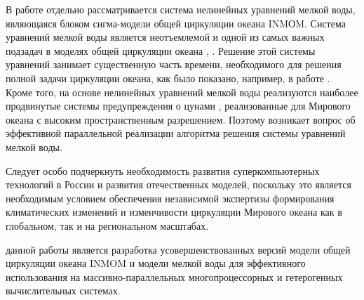 В работе отдельно рассматривается система нелинейных уравнений мелкой воды,
являющаяся блоком сигма-модели общей циркуляции океана INMОM.
Система уравнений мелкой воды является неотъемлемой и одной из самых важных подзадач в моделях общей циркуляции океана , .
Решение этой системы уравнений занимает существенную часть времени, необходимого для решения полной задачи циркуляции океана,
как было показано, например, в работе \cite{ChaplyginINMOM2017}.
Кроме того, на основе нелинейных уравнений мелкой воды реализуются наиболее продвинутые системы
предупреждения о цунами , реализованные для Мирового океана с высоким пространственным разрешением.
Поэтому возникает вопрос об эффективной параллельной реализации алгоритма решения системы уравнений мелкой воды.

Следует особо подчеркнуть необходимость развития суперкомпьютерных технологий в России и развития отечественных моделей, поскольку это является необходимым условием обеспечения независимой экспертизы формирования климатических изменений и изменчивости циркуляции Мирового океана как в глобальном, так и на региональном масштабах.


{\aim} данной работы является разработка усовершенствованных версий модели общей циркуляции океана INMOM и модели мелкой воды для эффективного использования на массивно-параллельных многопроцессорных и гетерогенных вычислительных системах.


